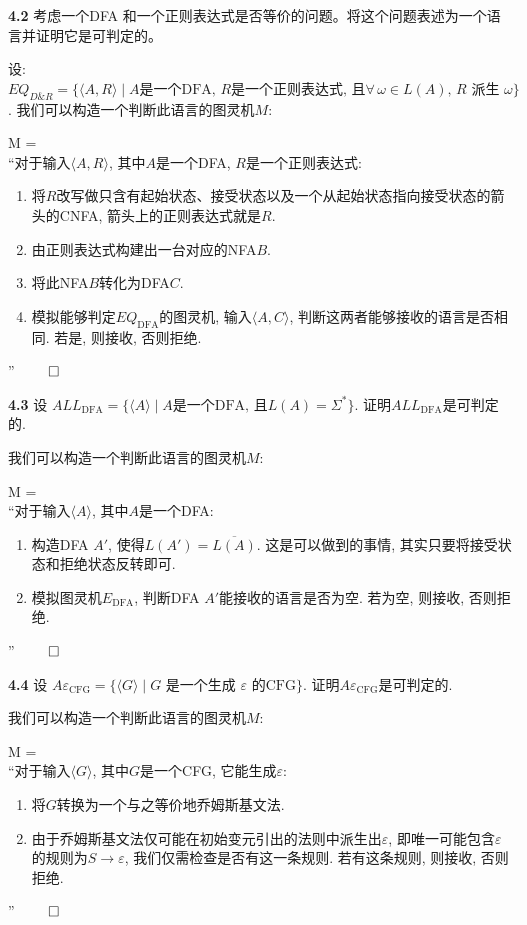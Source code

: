 \documentclass[UTF8]{report}
\newcommand{\problem}[1]{{\setlength{\parskip}{10pt}\noindent \bf{#1}}}
\renewenvironment{proof}{{\setlength{\parskip}{7pt}\noindent\hskip 2em \bf 证明 \quad}}{\hfill$\qed$\par}
\begin{document}
\problem{4.2} 考虑一个DFA 和一个正则表达式是否等价的问题。将这个问题表述为一个语言并证明它是可判定的。

\begin{proof}
    设: $EQ_{D\&R} = \{ \langle A, R \rangle \mid A \text{是一个DFA, } R \text{是一个正则表达式, 且} \forall\, \omega \in L(A)\text{, }R \text{ 派生 } \omega  \}$. 我们可以构造一个判断此语言的图灵机$M$:

    M =\\
    ``对于输入$\langle A, R \rangle$, 其中$A$是一个DFA, $R$是一个正则表达式:
    \begin{enumerate}
        \item 将$R$改写做只含有起始状态、接受状态以及一个从起始状态指向接受状态的箭头的CNFA, 箭头上的正则表达式就是$R$.
        \item 由正则表达式构建出一台对应的NFA$B$.
        \item 将此NFA$B$转化为DFA$C$.
        \item 模拟能够判定$EQ_{\mathrm{DFA}}$的图灵机, 输入$\langle A, C \rangle$, 判断这两者能够接收的语言是否相同. 若是, 则接收, 否则拒绝.
    \end{enumerate}
    ''
\end{proof}


\problem{4.3} 设 $ALL_{\mathrm{DFA}} = \{ \langle A \rangle \mid A \text{是一个DFA, 且}L(A) = \Sigma^*\}$. 证明$ALL_{\mathrm{DFA}}$是可判定的.

\begin{proof}
    我们可以构造一个判断此语言的图灵机$M$:

    M =\\
    ``对于输入$\langle A \rangle$, 其中$A$是一个DFA:
    \begin{enumerate}
        \item 构造DFA $A'$, 使得$L(A') = \overline{L(A)}$. 这是可以做到的事情, 其实只要将接受状态和拒绝状态反转即可.
        \item 模拟图灵机$E_{\mathrm{DFA}}$, 判断DFA $A'$能接收的语言是否为空. 若为空, 则接收, 否则拒绝.
    \end{enumerate}
    ''
\end{proof}



\problem{4.4} 设 $A\varepsilon_{\mathrm{CFG}} = \{ \langle G \rangle \mid G \text{ 是一个生成 } \varepsilon \text{ 的} \mathrm{CFG} \}$. 证明$A\varepsilon_{\mathrm{CFG}}$是可判定的.

\begin{proof}
    我们可以构造一个判断此语言的图灵机$M$:

    M =\\
    ``对于输入$\langle G \rangle$, 其中$G$是一个CFG, 它能生成$\varepsilon$:
    \begin{enumerate}
        \item 将$G$转换为一个与之等价地乔姆斯基文法.
        \item 由于乔姆斯基文法仅可能在初始变元引出的法则中派生出$\varepsilon$, 即唯一可能包含$\varepsilon$的规则为$S \to \varepsilon$, 我们仅需检查是否有这一条规则. 若有这条规则, 则接收, 否则拒绝.
    \end{enumerate}
    ''
\end{proof}
\end{document}
